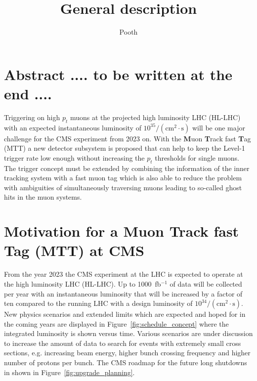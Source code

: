 \documentclass[11pt]{amsart}
\title{General description}
\author{Pooth}
\begin{document}
\maketitle
\section{Abstract .... to be written at the end ....}
Triggering on high $p_t$ muons at the projected high luminosity LHC (HL-LHC) with an expected instantaneous luminosity of $10^{35}/(\mathrm{cm}^2 \cdot\mathrm{s})$ will be 
one major challenge for the CMS experiment from 2023 on. With the {\bf M}uon  {\bf T}rack fast {\bf T}ag (MTT) a new detector subsystem is proposed that can help to keep the 
Level-1 trigger rate low enough without increasing the $p_t$ thresholds for single muons. The trigger concept must be extended by combining the information of the inner tracking
system with a fast muon tag which is also able to reduce the problem with ambiguities of simultaneously traversing muons leading to so-called ghost hits in the muon systems. 

\section{Motivation for a Muon Track fast Tag (MTT) at CMS}

From the year 2023 the CMS experiment at the LHC is expected to operate at the high luminosity LHC (HL-LHC). Up to 1000~fb$^{-1}$ of data will be collected per year with an 
instantaneous luminosity that will be increased by a factor of ten compared to the running LHC with a design luminosity of $10^{34}/(\mathrm{cm}^2 \cdot\mathrm{s})$. New physics 
scenarios and extended limits which are expected and hoped for in the coming years are displayed in Figure~\ref{fig:schedule_concept} where the integrated luminosity is shown versus 
time. Various scenarios are under discussion to increase the amount of data to search for events with extremely small cross sections, e.g. increasing beam energy, higher bunch 
crossing frequency and higher number of protons per bunch. The CMS roadmap for the future long shutdowns in shown in Figure~\ref{fig:upgrade_planning}.
\end{document}
